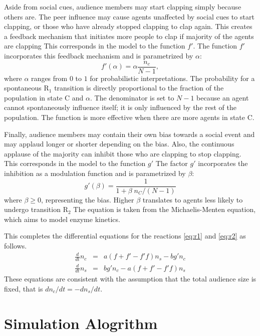 Aside from social cues, audience members may start clapping simply because others are.
The peer influence may cause agents unaffected by social cues to start clapping, or those who have already stopped clapping to clap again.
This creates a feedback mechanism that initiates more people to clap if majority of the agents are clapping
This corresponds in the model to the function $f'$.
The function $f'$ incorporates this feedback mechanism and is parametrized by $\alpha$:
\begin{equation}\label{eq:f'}
  f'(\alpha) = \alpha \frac{n_c}{N-1},
\end{equation}
where $\alpha$ ranges from $0$ to $1$ for probabilistic interpretations.
The probability for a spontaneous $\mathrm{R}_{1}$ transition is directly proportional to the fraction of the population in state C and $\alpha$. The denominator is set to $N-1$ because an agent cannot spontaneously influence itself; it is only influenced by the rest of the population.
The function is more effective when there are more agents in state C.

Finally, audience members may contain their own bias towards a social event and may applaud longer or shorter depending on the bias.
Also, the continuous applause of the majority can inhibit those who are clapping to stop clapping.
This corresponds in the model to the function $g'$
The factor $g'$ incorporates the inhibition as a modulation function and is parametrized by $\beta$: 
\begin{equation}\label{eq:g'}
  g'(\beta) = \frac{1}{1 + \beta\;n_C /(N-1)}
\end{equation}
where $\beta \geq 0$, representing the bias.
Higher $\beta$ translates to agents less likely to undergo transition $\mathrm{R}_{2}$ 
The equation is taken from the Michaelis-Menten equation, which aims to model enzyme kinetics\cite{michaelisconstant}.

This completes the differential equations for the reactions \eqref{eq:r1} and \eqref{eq:r2} as follows.
\begin{eqnarray}
\frac{d}{dt}n_{c} &=& a (f+f'-f'f) n_{s} - b g' n_{c}\label{eq:diff1} \\
\frac{d}{dt}n_{s} &=& b g' n_{c} - a (f+f'-f'f) n_{s}\label{eq:diff2}
\end{eqnarray}
These equations are consistent with the assumption that the total audience size is fixed, that is $dn_{c}/dt = -dn_{s}/dt$.

\section{Simulation Alogrithm}



